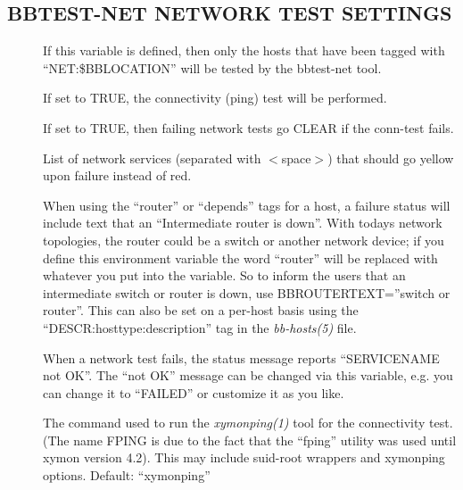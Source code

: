 \subsection{BBTEST-NET NETWORK TEST SETTINGS}


 \begin{description}

\item[] If this variable is defined, then only the
  hosts that have been tagged with ``NET:\$BBLOCATION'' will be tested
  by the bbtest-net tool. 


\item[] If set to TRUE, the connectivity (ping) test will be performed. 

 

\item[] If set to TRUE, then
  failing network tests go CLEAR if the conn-test fails. 


\item[] List of network services (separated with
  $<$space$>$) that should go yellow upon failure instead of red. 


 

\item[] When using the ``router'' or ``depends''
  tags for a host, a failure status will include text that an
  ``Intermediate router is down''. With todays network topologies, the
  router could be a switch or another network device; if you define
  this environment variable the word ``router'' will be replaced with
  whatever you put into the variable. So to inform the users that an
  intermediate switch or router is down, use BBROUTERTEXT=''switch or
  router''. This can also be set on a per-host basis using the
  ``DESCR:hosttype:description'' tag in the \emph{bb-hosts(5)} file. 


 

\item[] When a network test fails, the status
  message reports ``SERVICENAME not OK''. The ``not OK'' message can
  be changed via this variable, e.g. you can change it to ``FAILED''
  or customize it as you like. 


 

\item[] The command used to run the \emph{xymonping(1)}
  tool for the connectivity test. (The name FPING is due to the fact
  that the ``fping'' utility was used until xymon version 4.2). This
  may include suid-root wrappers and xymonping options. Default:
  ``xymonping'' 



\end{description}
